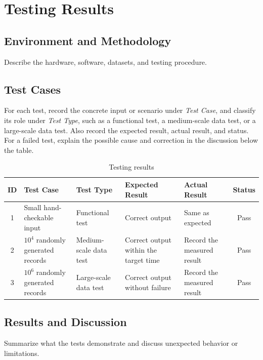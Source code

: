 \section{Testing Results}

\subsection{Environment and Methodology}

Describe the hardware, software, datasets, and testing procedure.

\subsection{Test Cases}

For each test, record the concrete input or scenario under \emph{Test Case},
and classify its role under \emph{Test Type}, such as a functional test, a
medium-scale data test, or a large-scale data test. Also record the expected
result, actual result, and status. For a failed test, explain the possible
cause and correction in the discussion below the table.

\begin{table}[htbp]
  \centering
  \caption{Testing results}
  \label{tab:test-results}
  \small
  \begin{tabularx}{\textwidth}{c p{} p{} X X c}
    \toprule
    ID & Test Case & Test Type & Expected Result & Actual Result & Status \\
    \midrule
    1 & Small hand-checkable input & Functional test & Correct output & Same as expected & Pass \\
    2 & $10^4$ randomly generated records & Medium-scale data test & Correct output within the target time & Record the measured result & Pass \\
    3 & $10^6$ randomly generated records & Large-scale data test & Correct output without failure & Record the measured result & Pass \\
    \bottomrule
  \end{tabularx}
\end{table}

\subsection{Results and Discussion}

Summarize what the tests demonstrate and discuss unexpected behavior or
limitations.
